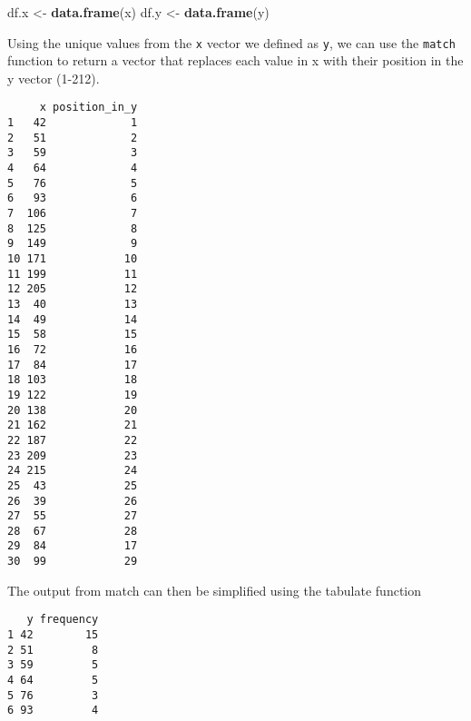 \documentclass[12pt,]{article}
\newenvironment{Shaded}{\begin{snugshade}}{\end{snugshade}}
\newcommand{\DataTypeTok}[1]{\textcolor[rgb]{0.13,0.29,0.53}{#1}}
\newcommand{\DecValTok}[1]{\textcolor[rgb]{0.00,0.00,0.81}{#1}}
\newcommand{\KeywordTok}[1]{\textcolor[rgb]{0.13,0.29,0.53}{\textbf{#1}}}
\newcommand{\NormalTok}[1]{#1}
\newcommand{\OperatorTok}[1]{\textcolor[rgb]{0.81,0.36,0.00}{\textbf{#1}}}
\newcommand{\StringTok}[1]{\textcolor[rgb]{0.31,0.60,0.02}{#1}}
\begin{document}
\begin{Shaded}
\begin{Highlighting}[]
\NormalTok{df.x <-}\StringTok{ }\KeywordTok{data.frame}\NormalTok{(x)}
\NormalTok{df.y <-}\StringTok{ }\KeywordTok{data.frame}\NormalTok{(y)}
\end{Highlighting}
\end{Shaded}

Using the unique values from the \texttt{x} vector we defined as
\texttt{y}, we can use the \texttt{match} function to return a vector
that replaces each value in x with their position in the y vector
(1-212).

\begin{Shaded}
\end{Shaded}

\begin{verbatim}
     x position_in_y
1   42             1
2   51             2
3   59             3
4   64             4
5   76             5
6   93             6
7  106             7
8  125             8
9  149             9
10 171            10
11 199            11
12 205            12
13  40            13
14  49            14
15  58            15
16  72            16
17  84            17
18 103            18
19 122            19
20 138            20
21 162            21
22 187            22
23 209            23
24 215            24
25  43            25
26  39            26
27  55            27
28  67            28
29  84            17
30  99            29
\end{verbatim}

The output from match can then be simplified using the tabulate function

\begin{Shaded}
\end{Shaded}

\begin{verbatim}
   y frequency
1 42        15
2 51         8
3 59         5
4 64         5
5 76         3
6 93         4
\end{verbatim}
\end{document}
